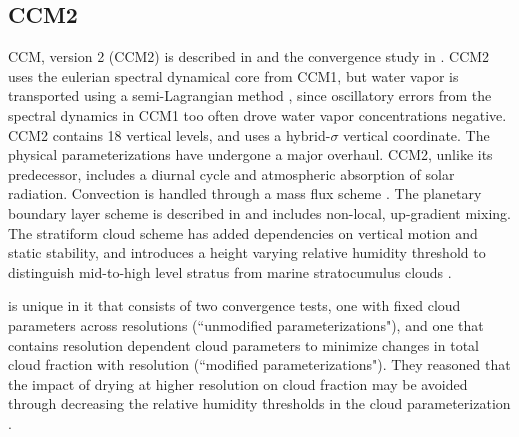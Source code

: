 \subsection{CCM2}

CCM, version 2 (CCM2) is described in \cite{CCM2} and the convergence study in \cite{WETAL1995CD}. CCM2 uses the eulerian spectral dynamical core from CCM1, but water vapor is transported using a semi-Lagrangian method \citep{WR1994TELLUS}, since oscillatory errors from the spectral dynamics in CCM1 too often drove water vapor concentrations negative. CCM2 contains 18 vertical levels, and uses a hybrid-$\sigma$ vertical coordinate. The physical parameterizations have undergone a major overhaul. CCM2, unlike its predecessor, includes a diurnal cycle and atmospheric absorption of solar radiation. Convection is handled through a mass flux scheme \citep{H1994JGR}. The planetary boundary layer scheme is described in \cite{HB1993JCLIM} and includes non-local, up-gradient mixing. The stratiform cloud scheme has added dependencies on vertical motion and static stability, and introduces a height varying relative humidity threshold to distinguish mid-to-high level stratus from marine stratocumulus clouds \citep{KETAL1994JGR}.

\cite{WETAL1995CD} is unique in it that consists of two convergence tests, one with fixed cloud parameters across resolutions (``unmodified parameterizations"), and one that contains resolution dependent cloud parameters to minimize changes in total cloud fraction with resolution (``modified parameterizations"). They reasoned that the impact of drying at higher resolution on cloud fraction may be avoided through decreasing the relative humidity thresholds in the cloud parameterization \citep{KETAL1994JGR}. 

